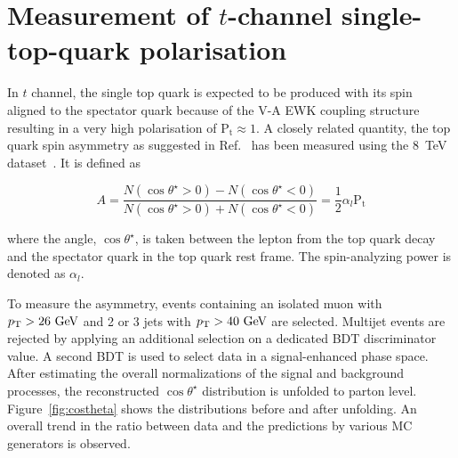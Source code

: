 \documentclass{PoS}
\begin{document}
\section{Measurement of $t$-channel single-top-quark polarisation}

In $t$ channel, the single top quark is expected to be produced with its spin aligned to the spectator quark because of the V-A EWK coupling structure resulting in a very high polarisation of $\mathrm{P_t}\approx1$. A closely related quantity, the top quark spin asymmetry as suggested in Ref.~\cite{wbeyond} has been measured using the 8~TeV dataset~\cite{CMS-PAS-TOP-13-001}. It is defined as 

\begin{equation}
A=\frac{N(\cos\theta^{\star}>0)-N(\cos\theta^{\star}<0)}{N(\cos\theta^{\star}>0)+N(\cos\theta^{\star}<0)}=\frac{1}{2}\alpha_{l}\mathrm{P_{t}}
\end{equation}

where the angle, $\cos\theta^{\star}$, is taken between the lepton from the top quark decay and the spectator quark in the top quark rest frame. The spin-analyzing power is denoted as $\alpha_{l}$.

To measure the asymmetry, events containing an isolated muon with $p_\mathrm{T}>26~\mathrm{GeV}$ and 2 or 3 jets with $p_\mathrm{T}>40~\mathrm{GeV}$ are selected. Multijet events are rejected by applying an additional selection on a dedicated BDT discriminator value. A second BDT is used to select data in a signal-enhanced phase space. After estimating the overall normalizations of the signal and background processes, the reconstructed $\cos\theta^{\star}$ distribution is unfolded to parton level. Figure~\ref{fig:costheta} shows the distributions before and after unfolding. An overall trend in the ratio between data and the predictions by various MC generators is observed.
\end{document}
